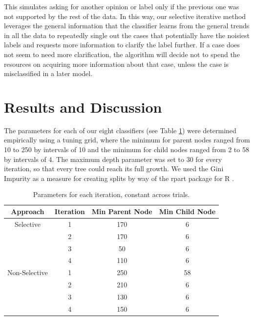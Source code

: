\documentclass[]{spie}
\begin{document}
This simulates asking for another opinion or label only if the previous one was not supported by the rest of the data. In this way, our selective iterative method leverages the general information that the classifier learns from the general trends in all the data to repeatedly single out the cases that potentially have the noisiest labels and requests more information to clarify the label further. If a case does not seem to need more clarification, the algorithm will decide not to spend the resources on acquiring more information about that case, unless the case is misclassified in a later model.
\section{Results and Discussion}
\label{sec:results}

The parameters for each of our eight classifiers (see Table \ref{tab:params}) were determined empirically using a tuning grid, where the minimum for parent nodes ranged from 10 to 250 by intervals of 10 and the minimum for child nodes ranged from 2 to 58 by intervals of 4. The maximum depth parameter was set to 30 for every iteration, so that every tree could reach its full growth. We used the Gini Impurity as a measure for creating splits by way of the rpart package for R\cite{rpart}\cite{R} .

\begin{table}[h]
  \centering
      \caption{Parameters for each iteration, constant across trials.} 
    \begin{tabular}{|c|c|c|c|}
    \toprule
 \multicolumn{1}{|p{2cm}|}{\centering Approach} & \multicolumn{1}{|p{1.5cm}|}{\centering Iteration} & 
 \multicolumn{1}{|p{2cm}|}{\centering Min Parent Node} & \multicolumn{1}{|p{2cm}|}{\centering Min Child Node} \\
    \midrule
        Selective & 1     & 170   & 6 \\
        & 2     & 170   & 6 \\
         & 3     & 50    & 6 \\
         & 4     & 110   & 6 \\
          \midrule
        Non-Selective & 1     & 250   & 58 \\
         & 2     & 210   & 6 \\
         & 3     & 130   & 6 \\
         & 4     & 150   & 6 \\
    \bottomrule
    \end{tabular}
  \label{tab:params}
\end{table}
\end{document}
